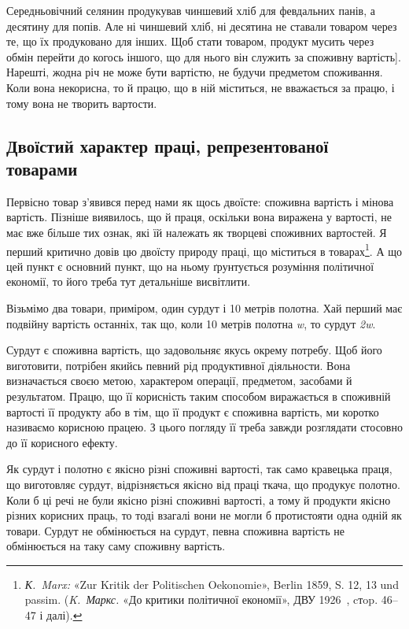 \parcont{}  %
Середньовічний селянин продукував чиншевий хліб для февдальних
панів, а десятину для попів. Але ні чиншевий хліб, ні десятина
не ставали товаром через те, що їх продуковано для інших.
Щоб стати товаром, продукт мусить через обмін перейти до когось
іншого, що для нього він служить за споживну вартість]. Нарешті,
жодна річ не може бути вартістю, не будучи предметом
споживання. Коли вона некорисна, то й працю, що в ній міститься,
не вважається за працю, і тому вона не творить вартости.

\subsection{Двоїстий характер праці, репрезентованої товарами
}

Первісно товар з’явився перед нами як щось двоїсте: споживна
вартість і мінова вартість. Пізніше виявилось, що й праця, оскільки
вона виражена у вартості, не має вже більше тих ознак,
які їй належать як творцеві споживних вартостей. Я перший
критично довів цю двоїсту природу праці, що міститься в товарах\footnote{
\emph{К.~Marx:} «Zur Kritik der Politischen Oekonomie», Berlin 1859,
S. 12, 13 und passim. (\emph{K.~Маркс.} «До критики політичної економії», ДВУ
1926~, cтop. 46--47 і далі).
}. А що цей пункт є основний пункт, що на ньому ґрунтується
розуміння політичної економії, то його треба тут детальніше
висвітлити.

Візьмімо два товари, приміром, один сурдут і 10 метрів полотна.
Хай перший має подвійну вартість останніх, так що, коли
10 метрів полотна \deq{} \emph{w}, то сурдут \deq{} \emph{2w}.

Сурдут є споживна вартість, що задовольняє якусь окрему
потребу. Щоб його виготовити, потрібен якийсь певний рід продуктивної
діяльности. Вона визначається своєю метою, характером
операції, предметом, засобами й результатом. Працю, що її
корисність таким способом виражається в споживній вартості її
продукту або в тім, що її продукт є споживна вартість, ми коротко
називаємо корисною працею. З цього погляду її треба завжди
розглядати стосовно до її корисного ефекту.

Як сурдут і полотно є якісно різні споживні вартості, так само
кравецька праця, що виготовляє сурдут, відрізняється якісно
від праці ткача, що продукує полотно. Коли б ці речі не були
якісно різні споживні вартості, а тому й продукти якісно різних
корисних праць, то тоді взагалі вони не могли б протистояти одна
одній як товари. Сурдут не обмінюється на сурдут, певна споживна
вартість не обмінюється на таку саму споживну вартість.

